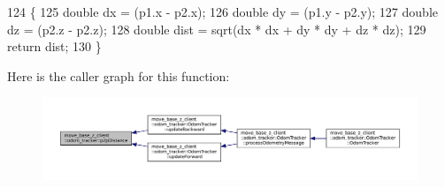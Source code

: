 \begin{DoxyCode}
124 \{
125     \textcolor{keywordtype}{double} dx = (p1.x - p2.x);
126     \textcolor{keywordtype}{double} dy = (p1.y - p2.y);
127     \textcolor{keywordtype}{double} dz = (p2.z - p2.z);
128     \textcolor{keywordtype}{double} dist = sqrt(dx * dx + dy * dy + dz * dz);
129     \textcolor{keywordflow}{return} dist;
130 \}
\end{DoxyCode}
Here is the caller graph for this function\+:
\nopagebreak
\begin{figure}[H]
\begin{center}
\leavevmode
\includegraphics[width=350pt]{namespacemove__base__z__client_1_1odom__tracker_a4437fd4b6bf9ca87f5b806ad408fb430_icgraph}
\end{center}
\end{figure}
